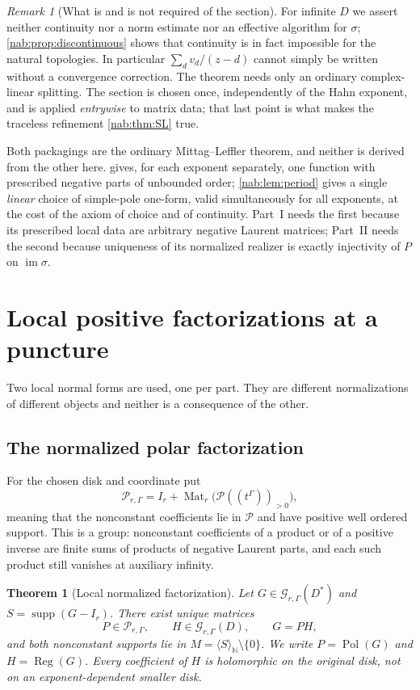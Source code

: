 \documentclass[11pt,letterpaper]{article}
\newtheorem{theorem}{Theorem}[section]
\theoremstyle{definition}
\theoremstyle{remark}
\newtheorem{remark}[remark]{Remark}
\newcommand{\N}{\mathbb N}
\newcommand{\GG}{\mathscr G_{r,\Gamma}}
\newcommand{\Mat}{\operatorname{Mat}}
\newcommand{\supp}{\operatorname{supp}}
\newcommand{\Pol}{\operatorname{Pol}}
\newcommand{\Reg}{\operatorname{Reg}}
\newcommand{\im}{\operatorname{im}}
\newcommand{\PP}{\mathcal P}
\newcommand{\angles}[1]{\langle #1\rangle_{\N}}
\numberwithin{equation}{section}
\begin{document}
\begin{remark}[What is and is not required of the section]
\label{nab:rem:section}
For infinite $D$ we assert neither continuity nor a norm estimate nor an
effective algorithm for $\sigma$; \cref{nab:prop:discontinuous} shows that
continuity is in fact impossible for the natural topologies. In particular
$\sum_dv_d/(z-d)$ cannot simply be written without a convergence correction.
The theorem needs only an ordinary complex-linear splitting. The section is
chosen once, independently of the Hahn exponent, and is applied
\emph{entrywise} to matrix data; that last point is what makes the traceless
refinement \cref{nab:thm:SL} true.
\end{remark}

Both packagings are the ordinary Mittag--Leffler theorem, and neither is
derived from the other here.  gives, for each exponent
separately, one function with prescribed negative parts of unbounded order;
\cref{nab:lem:period} gives a single \emph{linear} choice of simple-pole
one-form, valid simultaneously for all exponents, at the cost of the axiom of
choice and of continuity. Part~I needs the first because its prescribed local
data are arbitrary negative Laurent matrices; Part~II needs the second because
uniqueness of its normalized realizer is exactly injectivity of $P$ on
$\im\sigma$.

\section{Local positive factorizations at a puncture}\label{nab:sec:local}

Two local normal forms are used, one per part. They are different
normalizations of different objects and neither is a consequence of the other.

\subsection{The normalized polar factorization}

For the chosen disk and coordinate put
\[
 \mathscr P_{r,\Gamma}=I_r+\Mat_r\bigl(\PP((t^\Gamma))_{>0}\bigr),
\]
meaning that the nonconstant coefficients lie in $\PP$ and have positive well
ordered support. This is a group: nonconstant coefficients of a product or of
a positive inverse are finite sums of products of negative Laurent parts, and
each such product still vanishes at auxiliary infinity.

\begin{theorem}[Local normalized factorization]\label{nab:thm:local}
Let $G\in\GG(D^*)$ and $S=\supp(G-I_r)$. There exist unique matrices
\begin{equation}\label{nab:eq:localfactor}
 P\in\mathscr P_{r,\Gamma},\qquad H\in\GG(D),\qquad G=PH,
\end{equation}
and both nonconstant supports lie in $M=\angles S\setminus\{0\}$. We write
$P=\Pol(G)$ and $H=\Reg(G)$. Every coefficient of $H$ is holomorphic on the
\emph{original} disk, not on an exponent-dependent smaller disk.
\end{theorem}
\end{document}
